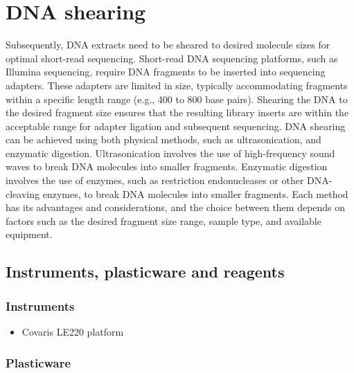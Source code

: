\documentclass[
]{book}
\providecommand{\tightlist}{%
  \setlength{\itemsep}{0pt}\setlength{\parskip}{0pt}}
\begin{document}
\hypertarget{dna-shearing}{%
\chapter{DNA shearing}\label{dna-shearing}}

Subsequently, DNA extracts need to be sheared to desired molecule sizes for optimal short-read sequencing. Short-read DNA sequencing platforms, such as Illumina sequencing, require DNA fragments to be inserted into sequencing adapters. These adapters are limited in size, typically accommodating fragments within a specific length range (e.g., 400 to 800 base pairs). Shearing the DNA to the desired fragment size ensures that the resulting library inserts are within the acceptable range for adapter ligation and subsequent sequencing. DNA shearing can be achieved using both physical methods, such as ultrasonication, and enzymatic digestion. Ultrasonication involves the use of high-frequency sound waves to break DNA molecules into smaller fragments. Enzymatic digestion involves the use of enzymes, such as restriction endonucleases or other DNA-cleaving enzymes, to break DNA molecules into smaller fragments. Each method has its advantages and considerations, and the choice between them depends on factors such as the desired fragment size range, sample type, and available equipment.

\hypertarget{instruments-plasticware-and-reagents-2}{%
\section{Instruments, plasticware and reagents}\label{instruments-plasticware-and-reagents-2}}

\hypertarget{instruments-2}{%
\subsection*{Instruments}\label{instruments-2}}

\begin{itemize}
\tightlist
\item
  Covaris LE220 platform
\end{itemize}

\hypertarget{plasticware-2}{%
\subsection*{Plasticware}\label{plasticware-2}}
\end{document}
